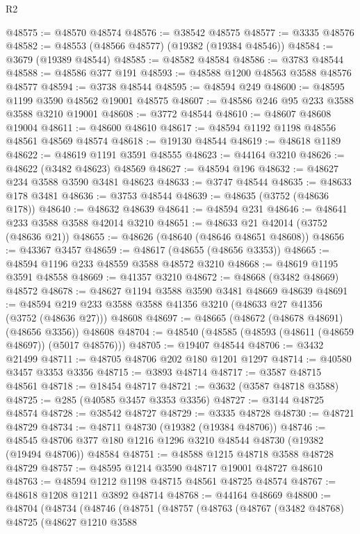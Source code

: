 \begin{lexlean}{R2}
\begin{coremodule}
@48575 := @48570 @48574
@48576 := @38542 @48575
@48577 := @3335 @48576
@48582 := @48553 (@48566 @48577) (@19382 (@19384 @48546))
@48584 := @3679 (@19389 @48544)
@48585 := @48582 @48584
@48586 := @3783 @48544
@48588 := @48586 @377 @191
@48593 := @48588 @1200 @48563 @3588 @48576 @48577
@48594 := @3738 @48544
@48595 := @48594 @249
@48600 := @48595 @1199 @3590 @48562 @19001 @48575
@48607 := @48586 @246 @95 @233 @3588 @3588 @3210 @19001
@48608 := @3772 @48544
@48610 := @48607 @48608 @19004
@48611 := @48600 @48610
@48617 := @48594 @1192 @1198 @48556 @48561 @48569 @48574
@48618 := @19130 @48544
@48619 := @48618 @1189
@48622 := @48619 @1191 @3591 @48555
@48623 := @44164 @3210
@48626 := @48622 (@3482 @48623) @48569
@48627 := @48594 @196
@48632 := @48627 @234 @3588 @3590 @3481 @48623
@48633 := @3747 @48544
@48635 := @48633 @178 @3481
@48636 := @3753 @48544
@48639 := @48635 (@3752 (@48636 @178))
@48640 := @48632 @48639
@48641 := @48594 @231
@48646 := @48641 @233 @3588 @3588 @42014 @3210
@48651 := @48633 @21 @42014 (@3752 (@48636 @21))
@48655 := @48626 (@48640 (@48646 @48651 @48608))
@48656 := @43367 @3457
@48659 := @48617 (@48655 (@48656 @3353))
@48665 := @48594 @1196 @233 @48559 @3588 @48572 @3210
@48668 := @48619 @1195 @3591 @48558
@48669 := @41357 @3210
@48672 := @48668 (@3482 @48669) @48572
@48678 := @48627 @1194 @3588 @3590 @3481 @48669 @48639
@48691 := @48594 @219 @233 @3588 @3588 @41356 @3210 (@48633 @27 @41356 (@3752 (@48636 @27))) @48608
@48697 := @48665 (@48672 (@48678 @48691) (@48656 @3356)) @48608
@48704 := @48540 (@48585 (@48593 (@48611 (@48659 @48697)) (@5017 @48576)))
@48705 := @19407 @48544
@48706 := @3432 @21499
@48711 := @48705 @48706 @202 @180 @1201 @1297
@48714 := @40580 @3457 @3353 @3356
@48715 := @3893 @48714
@48717 := @3587 @48715 @48561
@48718 := @18454 @48717
@48721 := @3632 (@3587 @48718 @3588)
@48725 := @285 (@40585 @3457 @3353 @3356)
@48727 := @3144 @48725 @48574
@48728 := @38542 @48727
@48729 := @3335 @48728
@48730 := @48721 @48729
@48734 := @48711 @48730 (@19382 (@19384 @48706))
@48746 := @48545 @48706 @377 @180 @1216 @1296 @3210 @48544 @48730 (@19382 (@19494 @48706)) @48584
@48751 := @48588 @1215 @48718 @3588 @48728 @48729
@48757 := @48595 @1214 @3590 @48717 @19001 @48727 @48610
@48763 := @48594 @1212 @1198 @48715 @48561 @48725 @48574
@48767 := @48618 @1208 @1211 @3892 @48714
@48768 := @44164 @48669
@48800 := @48704
    (@48734
      (@48746
        (@48751
          (@48757
            (@48763
              (@48767
                (@3482 @48768)
                @48725
                (@48627
                  @1210
                  @3588

\end{coremodule}
\end{lexlean}
